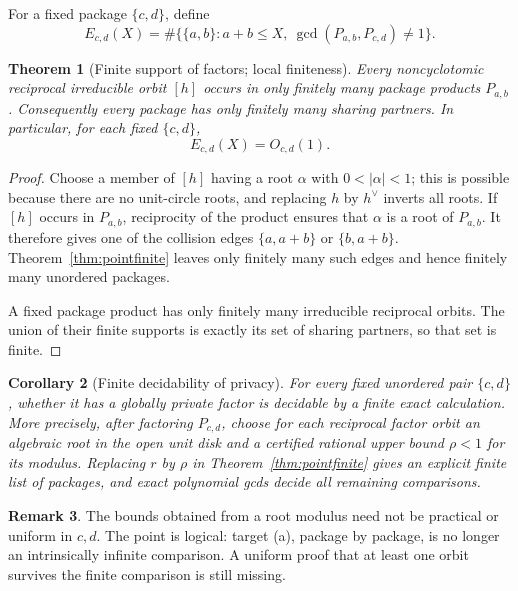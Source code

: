 \documentclass[11pt]{article}
\numberwithin{equation}{section}
\newtheorem{theorem}{Theorem}[section]
\newtheorem{corollary}[theorem]{Corollary}
\theoremstyle{definition}
\newtheorem{remark}[theorem]{Remark}
\begin{document}
For a fixed package \(\{c,d\}\), define
\[
 E_{c,d}(X)=\#\bigl\{\{a,b\}:a+b\leq X,
 \ \gcd(P_{a,b},P_{c,d})\neq1\bigr\}.
\]

\begin{theorem}[Finite support of factors; local finiteness]
\label{thm:localfinite}
Every noncyclotomic reciprocal irreducible orbit \([h]\) occurs in only
finitely many package products \(P_{a,b}\).  Consequently every package has
only finitely many sharing partners.  In particular, for each fixed
\(\{c,d\}\),
\[
 E_{c,d}(X)=O_{c,d}(1).
\]
\end{theorem}

\begin{proof}
Choose a member of \([h]\) having a root \(\alpha\) with
\(0<|\alpha|<1\); this is possible because there are no unit-circle roots,
and replacing \(h\) by \(h^\vee\) inverts all roots.  If \([h]\) occurs
in \(P_{a,b}\), reciprocity of the product ensures that \(\alpha\) is a
root of \(P_{a,b}\).  It therefore gives one of the collision edges
\(\{a,a+b\}\) or \(\{b,a+b\}\).  Theorem~\ref{thm:pointfinite} leaves
only finitely many such edges and hence finitely many unordered packages.

A fixed package product has only finitely many irreducible reciprocal orbits.
The union of their finite supports is exactly its set of sharing partners, so
that set is finite.
\end{proof}

\begin{corollary}[Finite decidability of privacy]
\label{cor:privacydecidable}
For every fixed unordered pair \(\{c,d\}\), whether it has a globally
private factor is decidable by a finite exact calculation.  More precisely,
after factoring \(P_{c,d}\), choose for each reciprocal factor orbit an
algebraic root in the open unit disk and a certified rational upper bound
\(\rho<1\) for its modulus.  Replacing \(r\) by \(\rho\) in
Theorem~\ref{thm:pointfinite} gives an explicit finite list of packages, and
exact polynomial gcds decide all remaining comparisons.
\end{corollary}

\begin{remark}
The bounds obtained from a root modulus need not be practical or uniform in
\(c,d\).  The point is logical: target (a), package by package, is no longer
an intrinsically infinite comparison.  A uniform proof that at least one
orbit survives the finite comparison is still missing.
\end{remark}
\end{document}

